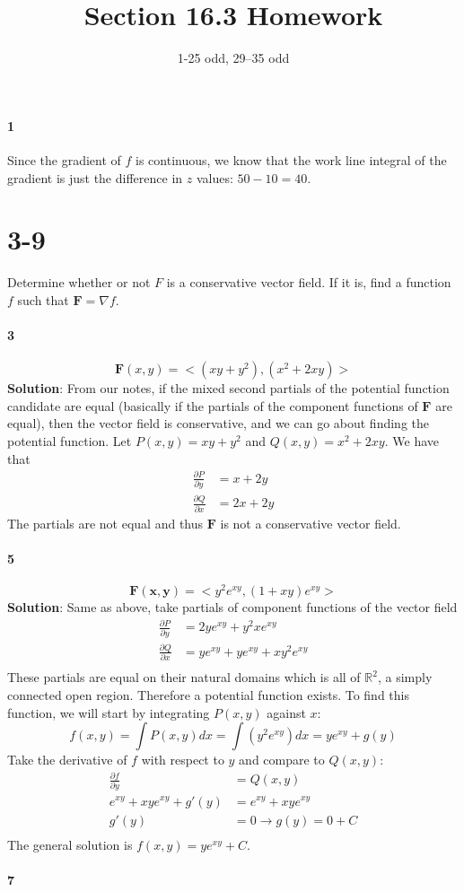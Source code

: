 \documentclass{article}
\title{Section 16.3 Homework}
\author{1-25 odd, 29--35 odd}
\date{}
\newcommand{\parf}[2]{\frac{\partial #1}{\partial #2}}
\begin{document}
    \maketitle

    \paragraph{1} Since the gradient of $f$ is continuous, we know that the work line integral of the gradient is just the difference in $z$ values: $50-10=40$.

    \section*{3-9} Determine whether or not $F$ is a conservative vector field.
    If it is, find a function $f$ such that $\mathbf{F} = \nabla f$.

    \paragraph{3}
    \[  \mathbf{F}(x,y) = <(xy+y^2), (x^2+2xy)> \]
    \textbf{Solution}: From our notes, if the mixed second partials of the potential function candidate are equal
    (basically if the partials of the component functions of $\mathbf{F}$ are equal), then the vector field is conservative, and
    we can go about finding the potential function.
    Let $P(x,y) = xy+y^2$ and $Q(x,y) = x^2+2xy$.
    We have that
    \begin{align*}
        \parf{P}{y} &= x + 2y \\
        \parf{Q}{x} &= 2x + 2y
    \end{align*}
    The partials are not equal and thus $\mathbf{F}$ is not a conservative vector field.


    \paragraph{5}
    \[\mathbf{F(x,y)}=<y^{2}e^{xy}, (1+xy)e^{xy}>\]
    \textbf{Solution}: Same as above, take partials of component functions of the vector field
    \begin{align*}
        \parf{P}{y} &= 2ye^{xy} + y^{2}xe^{xy} \\
        \parf{Q}{x} &= ye^{xy} + ye^{xy} + xy^{2}e^{xy}\\
    \end{align*}
    These partials are equal on their natural domains which is all of $\mathbb{R}^2$, a simply connected open region.
    Therefore a potential function exists.
    To find this function, we will start by integrating $P(x,y)$ against $x$:
    \[f(x,y)=\int P(x,y)dx = \int (y^{2}e^{xy}) dx = ye^{xy} + g(y)\]
    Take the derivative of $f$ with respect to $y$ and compare to $Q(x,y)$:
    \begin{align*}
        \parf{f}{y} &= Q(x,y) \\
        e^{xy} + xye^{xy} + g'(y) &= e^{xy} + xye^{xy} \\
        g'(y) &= 0 \rightarrow g(y) = 0 + C \\
    \end{align*}
    The general solution is $f(x,y) = ye^{xy} + C$.
    
    \paragraph{7}
\end{document}
